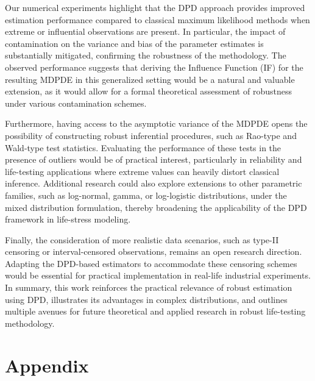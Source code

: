 \documentclass{article}
\begin{document}
Our numerical experiments highlight that the DPD approach provides improved estimation performance compared to classical maximum likelihood methods when extreme or influential observations are present. In particular, the impact of contamination on the variance and bias of the parameter estimates is substantially mitigated, confirming the robustness of the methodology. The observed performance suggests that deriving the Influence Function (IF) for the resulting MDPDE in this generalized setting would be a natural and valuable extension, as it would allow for a formal theoretical assessment of robustness under various contamination schemes.  

Furthermore, having access to the asymptotic variance of the MDPDE opens the possibility of constructing robust inferential procedures, such as Rao-type and Wald-type test statistics. Evaluating the performance of these tests in the presence of outliers would be of practical interest, particularly in reliability and life-testing applications where extreme values can heavily distort classical inference. Additional research could also explore extensions to other parametric families, such as log-normal, gamma, or log-logistic distributions, under the mixed distribution formulation, thereby broadening the applicability of the DPD framework in life-stress modeling.  

Finally, the consideration of more realistic data scenarios, such as type-II censoring or interval-censored observations, remains an open research direction. Adapting the DPD-based estimators to accommodate these censoring schemes would be essential for practical implementation in real-life industrial experiments. In summary, this work reinforces the practical relevance of robust estimation using DPD, illustrates its advantages in complex distributions, and outlines multiple avenues for future theoretical and applied research in robust life-testing methodology.


\clearpage





\clearpage
\section{Appendix}
\end{document}
